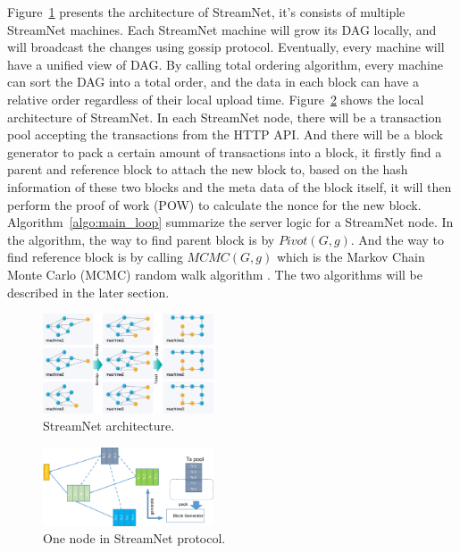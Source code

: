 Figure~\ref{architecture} presents the architecture of StreamNet,
it's consists of multiple StreamNet machines.
Each StreamNet machine will grow its DAG locally, and will broadcast the changes using gossip protocol. 
Eventually, every machine will have a unified view of DAG.
By calling total ordering algorithm, every machine can sort the DAG into a total order, 
and the data in each block can have a relative order regardless of their local upload time.
Figure~\ref{node} shows the local architecture of StreamNet.
In each StreamNet node, there will be a transaction pool accepting the transactions from the HTTP API.
And there will be a block generator to pack a certain amount of transactions into a block, it firstly find a 
parent and reference block to attach the new block to, based on the hash information of these two blocks and the meta data of the block itself, 
it will then perform the proof of work (POW) to calculate the nonce for the new block.
Algorithm~\ref{algo:main_loop} summarize the server logic for a StreamNet node.
In the algorithm, the way to find parent block is by $Pivot(G, g)$.
And the way to find reference block is by calling $MCMC(G, g)$ which is the Markov Chain Monte Carlo (MCMC) random walk algorithm \cite{popov2016tangle}.
The two algorithms will be described in the later section.

\begin{figure}[!ht]
\begin{center}
\includegraphics[width=0.45\textwidth]{figures/architecture.pdf}
    \caption{
        StreamNet architecture.
     }
\label{architecture}
\end{center}
\end{figure}

\begin{figure}[!ht]
\begin{center}
\includegraphics[width=0.45\textwidth]{figures/node.pdf}
    \caption{
        One node in StreamNet protocol.
     }
\label{node}
\end{center}
\end{figure}

